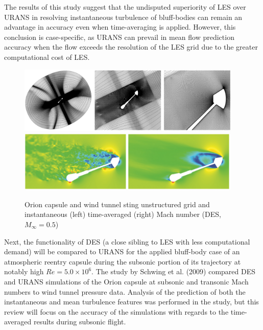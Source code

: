 \documentclass[journal]{new-aiaa}
\begin{document}
The results of this study suggest that the undisputed superiority of LES over URANS in resolving instantaneous turbulence of bluff-bodies can remain an advantage in accuracy even when time-averaging is applied. However, this conclusion is case-specific, as URANS can prevail in mean flow prediction accuracy when the flow exceeds the resolution of the LES grid due to the greater computational cost of LES.




















\begin{figure}[H]
\begin{center}
\includegraphics[width=0.95\textwidth]{Images/logan/schwing2015detachededdy_grid.pdf}
\includegraphics[width=0.95\textwidth]{Images/logan/schwing2015detachededdy_flow.pdf}
\caption{ Orion capsule and wind tunnel sting unstructured grid and instantaneous (left) time-averaged (right) Mach number (DES, $M_{\infty
}=0.5$) \cite{schwing2015detachededdy} }
\label{fig:oriongridflow}
\end{center}
\end{figure}

Next, the functionality of DES (a close sibling to LES with less computational demand) will be compared to URANS for the applied bluff-body case of an atmospheric reentry capsule during the subsonic portion of its trajectory at notably high $Re=5.0 \times 10^6$.  The study by Schwing et al. (2009) \cite{schwing2015detachededdy} compared DES and URANS simulations of the Orion capsule at subsonic and transonic Mach numbers to wind tunnel pressure data. Analysis of the prediction of both the instantaneous and mean turbulence features was performed in the study, but this review will focus on the accuracy of the simulations with regards to the time-averaged results during subsonic flight.
\end{document}
